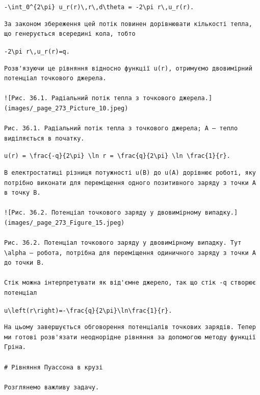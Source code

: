 \documentclass[
  ukrainian,
]{article}
\begin{document}
\texttt{-\textbackslash{}int\_0\^{}\{2\textbackslash{}pi\}\ u\_r(r)\textbackslash{},r\textbackslash{},d\textbackslash{}theta\ =\ -2\textbackslash{}pi\ r\textbackslash{},u\_r(r).}

\begin{verbatim}
За законом збереження цей потік повинен дорівнювати кількості тепла, що генерується всередині кола, тобто
\end{verbatim}

\texttt{-2\textbackslash{}pi\ r\textbackslash{},u\_r(r)=q.}

\begin{verbatim}
Розв'язуючи це рівняння відносно функції u(r), отримуємо двовимірний потенціал точкового джерела.

![Рис. 36.1. Радіальний потік тепла з точкового джерела.](images/_page_273_Picture_10.jpeg)

Рис. 36.1. Радіальний потік тепла з точкового джерела; A — тепло виділяється в початку.
\end{verbatim}

\texttt{u(r)\ =\ \textbackslash{}frac\{-q\}\{2\textbackslash{}pi\}\ \textbackslash{}ln\ r\ =\ \textbackslash{}frac\{q\}\{2\textbackslash{}pi\}\ \textbackslash{}ln\ \textbackslash{}frac\{1\}\{r\}.}

\begin{verbatim}
В електростатиці різниця потужності u(B) до u(A) дорівнює роботі, яку потрібно виконати для переміщення одного позитивного заряду з точки A в точку B.

![Рис. 36.2. Потенціал точкового заряду у двовимірному випадку.](images/_page_273_Figure_15.jpeg)

Рис. 36.2. Потенціал точкового заряду у двовимірному випадку. Тут \alpha — робота, потрібна для переміщення одиничного заряду з точки A до точки B.

Стік можна інтерпретувати як від'ємне джерело, так що стік -q створює потенціал
\end{verbatim}

\texttt{u\textbackslash{}left(r\textbackslash{}right)=-\textbackslash{}frac\{q\}\{2\textbackslash{}pi\}\textbackslash{}ln\textbackslash{}frac\{1\}\{r\}.}

\begin{verbatim}
На цьому завершується обговорення потенціалів точкових зарядів. Тепер ми готові розв'язати неоднорідне рівняння за допомогою методу функції Гріна.

# Рівняння Пуассона в крузі

Розглянемо важливу задачу.
\end{verbatim}
\end{document}
